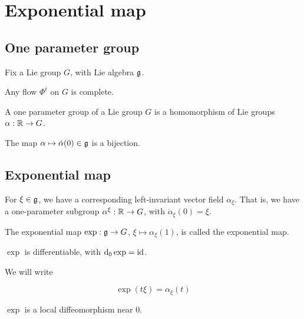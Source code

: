 \section{Exponential map}

\subsection{One parameter group}

Fix a Lie group \(G\), with Lie algebra \(\mathfrak{g}\).

\begin{lemma}
    Any flow \(\Phi^t\) on \(G\) is complete.
\end{lemma}

\begin{definition}
     A one parameter group of a Lie group \(G\) is a homomorphism of Lie groups \(\alpha : \mathbb{R} \to G\).
\end{definition}

\begin{lemma}
    The map \(\alpha \mapsto \dot\alpha(0) \in \mathfrak{g}\) is a bijection.
\end{lemma}

\subsection{Exponential map}

For \(\xi \in \mathfrak{g}\), we have a corresponding left-invariant vector field \(\alpha_\xi\). That is, we have a one-parameter subgroup \(\alpha^\xi : \mathbb{R} \to G\), with \(\dot\alpha_\xi(0) = \xi\).

\begin{definition}
     The exponential map \(\exp : \mathfrak{g} \to G\), \(\xi \mapsto \alpha_\xi(1)\), is called the exponential map.
\end{definition}

\begin{lemma}
    \(\exp\) is differentiable, with \(\dd_0 \exp = \operatorname{id}\).
\end{lemma}

\begin{notation}
    We will write

    \[\exp(t\xi) = \alpha_\xi(t)\]
\end{notation}

\begin{corollary}
    \(\exp\) is a local diffeomorphism near \(0\).
\end{corollary}

